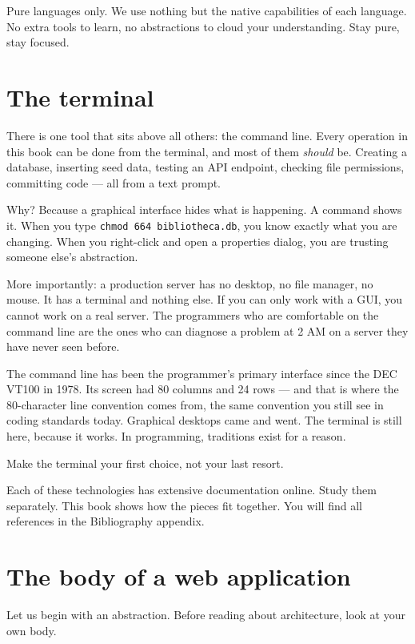 \documentclass[11pt,a4paper,oneside]{book}
\begin{document}
Pure languages only. We use nothing but the native capabilities
of each language. No extra tools to learn, no abstractions to
cloud your understanding. Stay pure, stay focused.

\hypertarget{the-terminal}{%
\section{The terminal}\label{the-terminal}}

There is one tool that sits above all others: the command line.
Every operation in this book can be done from the terminal, and
most of them \emph{should} be. Creating a database, inserting
seed data, testing an API endpoint, checking file permissions,
committing code --- all from a text prompt.

Why? Because a graphical interface hides what is happening. A
command shows it. When you type
\texttt{chmod\ 664\ bibliotheca.db}, you know exactly what you
are changing. When you right-click and open a properties dialog,
you are trusting someone else's abstraction.

More importantly: a production server has no desktop, no file
manager, no mouse. It has a terminal and nothing else. If you can
only work with a GUI, you cannot work on a real server. The
programmers who are comfortable on the command line are the ones
who can diagnose a problem at 2 AM on a server they have never
seen before.

The command line has been the programmer's primary interface
since the DEC VT100 in 1978. Its screen had 80 columns and 24
rows --- and that is where the 80-character line convention comes
from, the same convention you still see in coding standards
today. Graphical desktops came and went. The terminal is still
here, because it works. In programming, traditions exist for a
reason.

Make the terminal your first choice, not your last resort.

Each of these technologies has extensive documentation online.
Study them separately. This book shows how the pieces fit
together. You will find all references in the Bibliography
appendix.

\hypertarget{the-body-of-a-web-application}{%
\section{The body of a web
application}\label{the-body-of-a-web-application}}

Let us begin with an abstraction. Before reading about
architecture, look at your own body.
\end{document}
